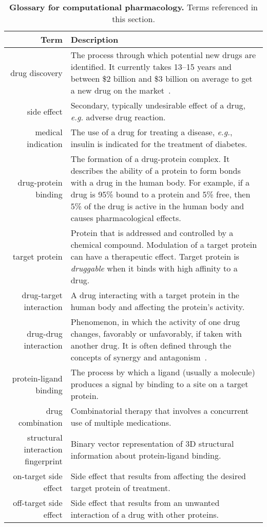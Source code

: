 \documentclass[5p]{elsarticle}
\newcommand{\eg}{\emph{e.g.}\xspace}
\newcommand{\rev}[1]{{\color{black}#1}}
\begin{document}
\begin{table*}[t]
  \centering
  \begin{tabular*}{\linewidth}{r@{\extracolsep{\fill}}p{}}
    \toprule
    \textbf{Term} & \textbf{Description} \\
    \midrule
    drug discovery & The process through which potential new drugs are identified. It currently takes \rev{13--15} years and between \rev{\$2 billion} and \$3 billion on average to get a new drug on the market~\cite{Scannell2012diagnosing}. \\
    side effect & Secondary, typically undesirable effect of a drug, \rev{\eg adverse} drug reaction.\\
    medical indication & The use of a drug for treating a disease, \eg, insulin is indicated for the treatment of diabetes. \\
    drug-protein binding & The formation of a drug-protein complex. It describes the ability of a protein to form bonds with a drug in the human body. For example, if a drug is 95\% bound to a protein and 5\% free, \rev{then 5\% of the drug is active in the human body and causes pharmacological effects}.  \\
    \rev{target protein} & Protein that \rev{is addressed and controlled by a chemical compound}. Modulation of \rev{a target protein} can have a therapeutic effect. \rev{Target protein is {\em druggable} when it binds with} high affinity to a drug.\\
    drug-target interaction & A drug interacting with a target protein in the human body and affecting the protein's activity.\\
    drug-drug interaction & Phenomenon, in which the activity of one drug changes, favorably or unfavorably, if taken with another drug. It is often defined through the concepts of synergy and antagonism~\cite{Yeh2009drug}.\\
    protein-ligand binding & The process by which a ligand (usually a molecule) produces a signal by binding to a site on a target protein.\\
    drug combination & Combinatorial therapy that involves a concurrent use of multiple medications.\\
    structural interaction fingerprint & Binary vector representation of 3D structural information about protein-ligand binding. \\
    on-target side effect & Side effect that results from affecting the desired target protein of treatment. \\
    off-target side effect & Side effect that results from an unwanted interaction of a drug with other proteins.\\
    \bottomrule
  \end{tabular*}
  \caption{\textbf{Glossary for computational pharmacology.}
    Terms referenced in this section.}
  \label{tab:S9-glossary-terms}
\end{table*}
\end{document}
